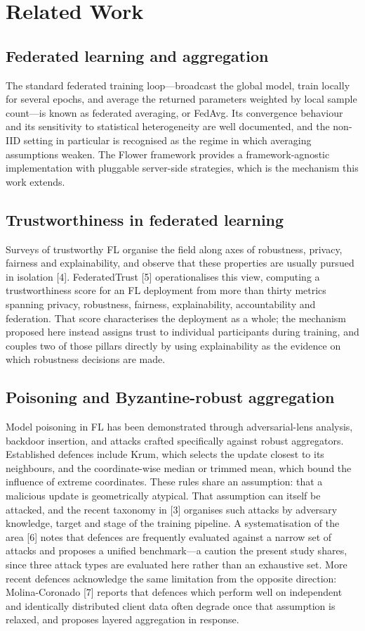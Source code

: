\documentclass[10pt,twocolumn,letterpaper]{article}
\begin{document}
\section{Related Work}

\subsection{Federated learning and aggregation}
The standard federated training loop---broadcast the global model, train
locally for several epochs, and average the returned parameters weighted by
local sample count---is known as federated averaging, or FedAvg. Its
convergence behaviour and its sensitivity to statistical heterogeneity are
well documented, and the non-IID setting in particular is recognised as the
regime in which averaging assumptions weaken. The Flower framework provides a
framework-agnostic implementation with pluggable server-side strategies, which
is the mechanism this work extends.

\subsection{Trustworthiness in federated learning}
Surveys of trustworthy FL organise the field along axes of robustness,
privacy, fairness and explainability, and observe that these properties are
usually pursued in isolation [4]. FederatedTrust
[5] operationalises this view, computing a
trustworthiness score for an FL deployment from more than thirty metrics
spanning privacy, robustness, fairness, explainability, accountability and
federation. That score characterises the deployment as a whole; the mechanism
proposed here instead assigns trust to individual participants during
training, and couples two of those pillars directly by using explainability as
the evidence on which robustness decisions are made.

\subsection{Poisoning and Byzantine-robust aggregation}
Model poisoning in FL has been demonstrated through adversarial-lens
analysis, backdoor insertion, and attacks crafted specifically against robust
aggregators. Established defences include Krum, which selects the update
closest to its neighbours, and the coordinate-wise median or trimmed mean,
which bound the influence of extreme coordinates. These rules share an
assumption: that a malicious update is geometrically atypical. That assumption
can itself be attacked, and the recent taxonomy in [3]
organises such attacks by adversary knowledge, target and stage of the
training pipeline. A systematisation of the area [6] notes
that defences are frequently evaluated against a narrow set of attacks and
proposes a unified benchmark---a caution the present study shares, since three
attack types are evaluated here rather than an exhaustive set.
More recent defences acknowledge the same limitation from the opposite
direction: Molina-Coronado [7] reports that defences
which perform well on independent and identically distributed client data
often degrade once that assumption is relaxed, and proposes layered
aggregation in response.
\end{document}
